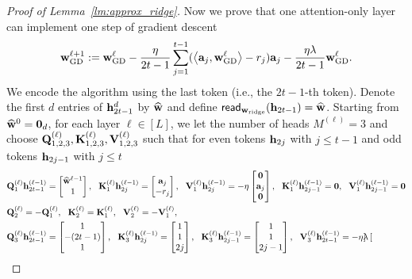 \begin{proof}[Proof of Lemma~\ref{lm:approx_ridge}]
Now we prove that one  attention-only layer can implement one step of gradient descent
\begin{align*}
    {\mathbf w}^{{{\ell}}+1}_{{\mathrm{GD}}}:={\mathbf w}^{{{\ell}}}_{{\mathrm{GD}}}- \frac{\eta}{2t-1}\sum_{j=1}^{t-1}(\left\langle{\mathbf a}_j,{\mathbf w}^{{\ell}}_{{\mathrm{GD}}}\right\rangle-r_j){\mathbf a}_j- \frac{\eta\lambda}{2t-1}{\mathbf w}^{{\ell}}_{{\mathrm{GD}}}.
\end{align*}
We encode the algorithm using the last token (i.e., the $2t-1$-th token). 
Denote the first $d$ entries of ${\mathbf h}_{2t-1}^{{d}}$ by $\widehat{{\mathbf w}}$ and  define ${\sf read}_{{\mathbf w}_{{\rm ridge}}}({\mathbf h}_{2t-1})=\widehat{{\mathbf w}}$. Starting from $\widehat{{\mathbf w}}^{0}={\mathbf 0}_d$, for each layer $\ell\in[L]$, we let the number of heads $M^{(\ell)}=3$ and  choose ${\mathbf Q}_{1,2,3}^{(\ell)},{\mathbf K}_{1,2,3}^{(\ell)},{\mathbf V}_{1,2,3}^{(\ell)}$ such that for even tokens ${\mathbf h}_{2j}$ with $j\leq t-1$ and odd tokens ${\mathbf h}_{2j-1}$ with $j\leq t$
\begin{align*}
    &{\mathbf Q}_1^{(\ell)}{\mathbf h}^{(\ell-1)}_{2t-1}=\begin{bmatrix}
        \widehat{{\mathbf w}}^{\ell-1}\\ 1
    \end{bmatrix},~~ {\mathbf K}_1^{(\ell)}{\mathbf h}^{(\ell-1)}_{2j}=\begin{bmatrix}
        {\mathbf a}_j\\ -r_j 
    \end{bmatrix},~~ {\mathbf V}_1^{(\ell)}{\mathbf h}^{(\ell-1)}_{2j}=-\eta\begin{bmatrix}
        {\mathbf 0}\\ {\mathbf a}_j \\ {\mathbf 0}
    \end{bmatrix},~~
    {\mathbf K}_1^{(\ell)}{\mathbf h}^{(\ell-1)}_{2j-1}={\mathbf 0}, ~~{\mathbf V}_1^{(\ell)}{\mathbf h}^{(\ell-1)}_{2j-1}={\mathbf 0}
    \\
    &
    {\mathbf Q}_2^{(\ell)}=-{\mathbf Q}_1^{(\ell)},~~ {\mathbf K}_2^{(\ell)}={\mathbf K}_1^{(\ell)},~~  {\mathbf V}_2^{(\ell)}=-{\mathbf V}_1^{(\ell)},\\
     &
     {\mathbf Q}_3^{(\ell)}{\mathbf h}^{(\ell-1)}_{2t-1}=\begin{bmatrix}
         1\\-(2t-1)\\ 1
    \end{bmatrix},~~ {\mathbf K}_3^{(\ell)}{\mathbf h}^{(\ell-1)}_{2j}=\begin{bmatrix}
        1\\ 1 \\2j
    \end{bmatrix},~~ {\mathbf K}_3^{(\ell)}{\mathbf h}^{(\ell-1)}_{2j-1}=\begin{bmatrix}
        1\\ 1 \\2j-1
    \end{bmatrix},~~ {\mathbf V}_3^{(\ell)}{\mathbf h}^{(\ell-1)}_{2t-1}=-\eta\lambda\begin{bmatrix}

\end{bmatrix}
\end{align*}
\end{proof}
